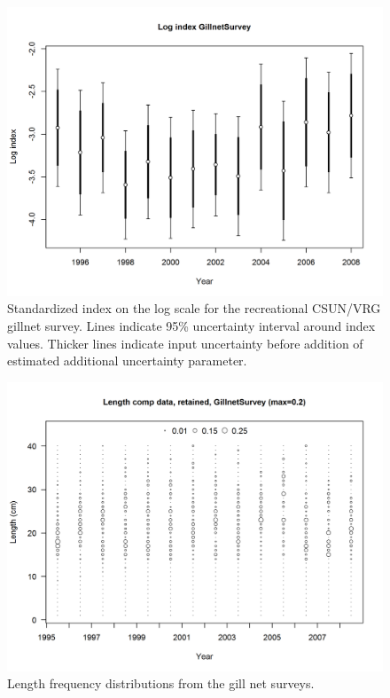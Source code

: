\documentclass[12pt,]{article}
\begin{document}
\begin{figure}[htbp]
\centering
\includegraphics{FIgures/index4_logcpuedata_GillnetSurvey.png}
\caption{Standardized index on the log scale for the recreational
CSUN/VRG gillnet survey. Lines indicate 95\% uncertainty interval around
index values. Thicker lines indicate input uncertainty before addition
of estimated additional uncertainty parameter.
\label{fig:index4_logcpuedata_GillnetSurvey}}
\end{figure}

\begin{figure}[htbp]
\centering
\includegraphics{Figures/comp_lendat_bubflt9mkt2.png}
\caption{Length frequency distributions from the gill net surveys.
\label{fig:Fleet9_GillnetSurvey_lendat_bubflt10mkt2}}
\end{figure}
\end{document}
